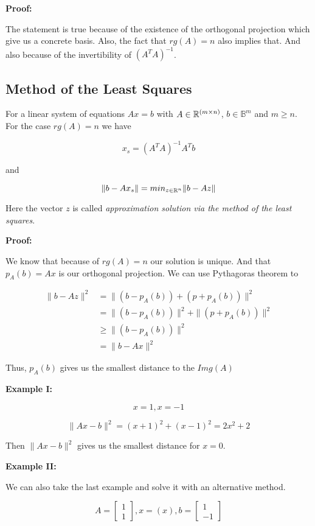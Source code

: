 \textbf{Proof:}

The statement is true because of the existence of the orthogonal projection which give us a concrete basis. Also, 
the fact that \(rg(A) = n\) also implies that. And also because of the invertibility of \({(A^T A)}^{-1}\).

\QED

\subsection{Method of the Least Squares}

For a linear system of equations \(Ax=b\) with \(A \in \mathbb{R}^{(m \times n)}\), 
\(b \in \mathbb{B}^m\) and \(m \ge n\). For the case \(rg(A) = n\) we have

\[
	x_s = {(A^T A)}^{-1} A^T b
\]

and 

\[
	\| b - Ax_s \| = min_{z \in \mathbb{R}^n} \| b - Az \| 
\]

Here the vector \(z\) is called \emph{approximation solution via the method of the least squares}.

\textbf{Proof:}

We know that because of \(rg(A) = n\) our solution is unique. And that \(p_A(b) = Ax\) is our orthogonal 
projection. We can use Pythagoras theorem to

\begin{align*}
	\| b - Az \|^2 &= \| (b  - p_A (b))  + (p + p_A(b)) \|^2 \\
				&=  \| (b  - p_A (b))\|^2  +\|(p + p_A(b)) \|^2 \\
				&\ge  \| (b  - p_A (b))\|^2 \\
				&= \| b - Ax \|^2 
\end{align*}

Thus, \(p_A(b)\) gives us the smallest distance to the \(Img(A)\)

\QED

\textbf{Example I:}

\[
	x = 1, x = -1
\]

\[
	\| Ax - b \|^2 = (x + 1)^2 + (x - 1)^2 = 2x^2 + 2 
\]

Then \(\| Ax - b \|^2\) gives us the smallest distance for \(x = 0\).

\textbf{Example II:}

We can also take the last example and solve it with an alternative method.

\[
	A = \begin{bmatrix} 1 \\ 1 \end{bmatrix}, x = (x), b = \begin{bmatrix} 1 \\ -1 \end{bmatrix}
\]

